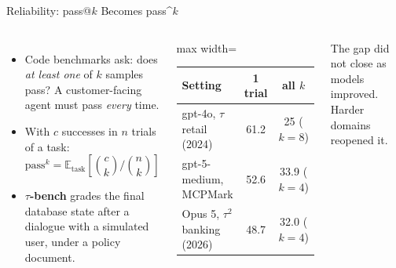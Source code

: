 \begin{frame}{Reliability: pass@$k$ Becomes pass\textasciicircum$k$}
    \begin{columns}[T,onlytextwidth]
        \begin{itemize}\itemsep0.4em
            \item Code benchmarks ask: does \emph{at least one} of $k$ samples pass? A customer-facing agent must pass \emph{every} time.
            \item With $c$ successes in $n$ trials of a task:
            \[
                \text{pass}^k = \mathbb{E}_{\text{task}}\!\left[\binom{c}{k}\Big/\binom{n}{k}\right]
            \]
            \item \textbf{$\tau$-bench} grades the final database state after a dialogue with a simulated user, under a policy document.
        \end{itemize}
        \centering
        \footnotesize
        \renewcommand{\arraystretch}{1.2}
        \begin{adjustbox}{max width=\linewidth}\begin{tabular}{>{\raggedright\arraybackslash}p{2.7cm}cc}
            \toprule
            \textbf{Setting} & \textbf{1 trial} & \textbf{all $k$} \\
            \midrule
            gpt-4o, $\tau$ retail (2024) & 61.2 & 25 ($k{=}8$) \\
            gpt-5-medium, MCPMark & 52.6 & 33.9 ($k{=}4$) \\
            \rowcolor{KAUSTcyan!12} Opus 5, $\tau^2$ banking (2026) & 48.7 & 32.0 ($k{=}4$) \\
            \bottomrule
        \end{tabular}\end{adjustbox}

        \vspace{0.5em}
        {\footnotesize The gap did not close as models improved. Harder domains reopened it.}
    \end{columns}
    \vspace{0.3em}
\end{frame}

